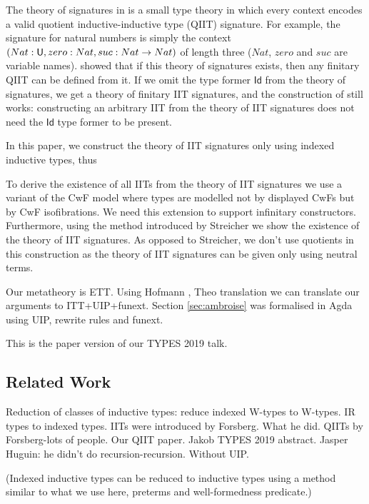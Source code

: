 \documentclass[a4paper,UKenglish,cleveref, autoref]{lipics-v2019}
\begin{document}
The theory of signatures in \cite{Kaposi:2019:CQI:3302515.3290315} is
a small type theory in which every context encodes a valid quotient
inductive-inductive type (QIIT) signature. For example, the signature
for natural numbers is simply the context
$(Nat:\mathsf{U},zero:Nat,suc:Nat\rightarrow Nat)$ of length three ($Nat$, $zero$ and
$suc$ are variable names). \cite{Kaposi:2019:CQI:3302515.3290315}
showed that if this theory of signatures exists, then any finitary
QIIT can be defined from it. If we omit the type former $\mathsf{Id}$
from the theory of signatures, we get a theory of finitary IIT
signatures, and the construction of
\cite{Kaposi:2019:CQI:3302515.3290315} still works: constructing an
arbitrary IIT from the theory of IIT signatures does not need the
$\mathsf{Id}$ type former to be present.

In this paper, we construct the theory of IIT signatures only using
indexed inductive types, thus 

To derive the existence of all IITs from the theory of IIT signatures
we use a variant of the CwF model
\cite{Kaposi:2019:CQI:3302515.3290315} where types are modelled not by
displayed CwFs but by CwF isofibrations. We need this extension to
support infinitary constructors. Furthermore, using the method
introduced by Streicher \cite{streichersemantics} we show the
existence of the theory of IIT signatures. As opposed to Streicher, we
don't use quotients in this construction as the theory of IIT
signatures can be given only using neutral terms.

Our metatheory is ETT. Using Hofmann \cite{}, Theo \cite{} translation
we can translate our arguments to ITT+UIP+funext. Section
\ref{sec:ambroise} was formalised in Agda using UIP, rewrite rules and
funext.

This is the paper version of our TYPES 2019 talk.

\subsection{Related Work}

Reduction of classes of inductive types: reduce indexed W-types to
W-types. IR types to indexed types. IITs were introduced by
Forsberg. What he did.  QIITs by Forsberg-lots of people. Our QIIT
paper. Jakob TYPES 2019 abstract.  Jasper Huguin: he didn't do
recursion-recursion. Without UIP.

(Indexed inductive types can be reduced to inductive types using a method
similar to what we use here, preterms and well-formedness predicate.)
\end{document}
